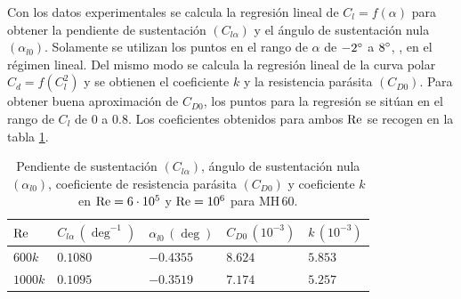 Con los datos experimentales se calcula la regresión lineal de $C_l = f \left( \alpha \right)$ para obtener la pendiente de sustentación $\left( C_{l\alpha} \right)$ y el ángulo de sustentación nula $\left( \alpha_{l0} \right)$. Solamente se utilizan los puntos en el rango de $\alpha$ de $-2\mathrm{^{\circ}}$ a $8\mathrm{^{\circ}}$, \ie, en el régimen lineal. Del mismo modo se calcula la regresión lineal de la curva polar $C_d = f \left( C_l^2 \right)$ y se obtienen el coeficiente $k$ y la resistencia parásita $\left( C_{D0} \right)$. Para obtener buena aproximación de $C_{D0}$, los puntos para la regresión se sitúan en el rango de $C_l$ de $0$ a $0.8$. Los coeficientes obtenidos para ambos $\mathrm{Re}$ se recogen en la tabla \ref{tab:coeficientes_mh60}.
\begin{table}[ht]
    \centering
    \begin{tabular}{lllll}
        \toprule[0.50mm]
        $\mathrm{Re}$ & 
        $C_{l\alpha} \, \left( \deg^{-1} \right)$ & 
        $\alpha_{l0} \, \left( \deg \right)$ & 
        $C_{D0} \, \left( 10^{-3} \right)$ & 
        $k \, \left( 10^{-3} \right)$ \\
        \midrule[0.25mm]
        $600k$ & $0.1080$ & $-0.4355$ & $8.624$ & $5.853$ \\
        $1000k$ & $0.1095$ & $-0.3519$ & $7.174$ & $5.257$ \\
        \bottomrule[0.50mm]
    \end{tabular}
    \caption{Pendiente de sustentación $\left( C_{l\alpha} \right)$, ángulo de sustentación nula $\left( \alpha_{l0} \right)$, coeficiente de resistencia parásita $\left( C_{D0} \right)$ y coeficiente $k$ en $\mathrm{Re} = 6 \cdot 10^5$ y $\mathrm{Re} = 10^6$ para $\mathrm{MH}\,60$.}
    \label{tab:coeficientes_mh60}
    \vspace{-4mm}
\end{table}

